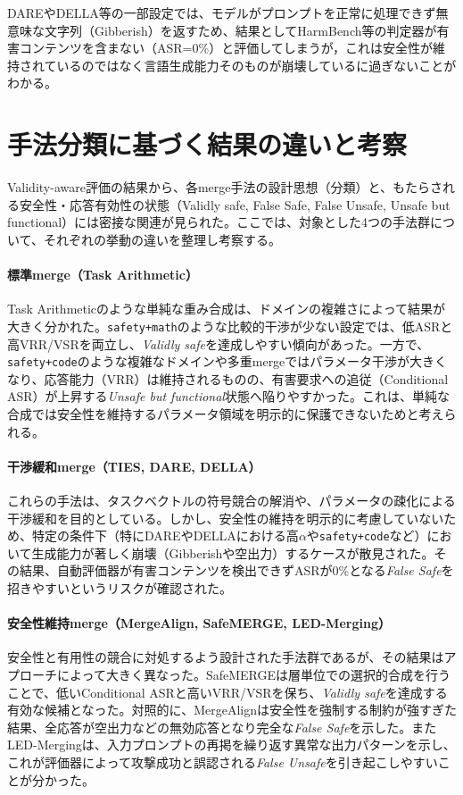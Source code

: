 \documentclass{article}
\begin{document}
DAREやDELLA等の一部設定では、モデルがプロンプトを正常に処理できず無意味な文字列（Gibberish）を返すため、結果としてHarmBench等の判定器が有害コンテンツを含まない（ASR=0\%）と評価してしまうが，これは安全性が維持されているのではなく言語生成能力そのものが崩壊しているに過ぎないことがわかる。
\color{black}

\section{手法分類に基づく結果の違いと考察}
\label{app:手法分類に基づく結果の違いと考察}
Validity-aware評価の結果から、各merge手法の設計思想（分類）と、もたらされる安全性・応答有効性の状態（Validly safe, False Safe, False Unsafe, Unsafe but functional）には密接な関連が見られた。ここでは、対象とした4つの手法群について、それぞれの挙動の違いを整理し考察する。

\paragraph{標準merge（Task Arithmetic）}
Task Arithmeticのような単純な重み合成は、ドメインの複雑さによって結果が大きく分かれた。\texttt{safety+math}のような比較的干渉が少ない設定では、低ASRと高VRR/VSRを両立し、\textit{Validly safe}を達成しやすい傾向があった。一方で、\texttt{safety+code}のような複雑なドメインや多重mergeではパラメータ干渉が大きくなり、応答能力（VRR）は維持されるものの、有害要求への追従（Conditional ASR）が上昇する\textit{Unsafe but functional}状態へ陥りやすかった。これは、単純な合成では安全性を維持するパラメータ領域を明示的に保護できないためと考えられる。

\paragraph{干渉緩和merge（TIES, DARE, DELLA）}
これらの手法は、タスクベクトルの符号競合の解消や、パラメータの疎化による干渉緩和を目的としている。しかし、安全性の維持を明示的に考慮していないため、特定の条件下（特にDAREやDELLAにおける高$\alpha$や\texttt{safety+code}など）において生成能力が著しく崩壊（Gibberishや空出力）するケースが散見された。その結果、自動評価器が有害コンテンツを検出できずASRが0\%となる\textit{False Safe}を招きやすいというリスクが確認された。

\paragraph{安全性維持merge（MergeAlign, SafeMERGE, LED-Merging）}
安全性と有用性の競合に対処するよう設計された手法群であるが、その結果はアプローチによって大きく異なった。SafeMERGEは層単位での選択的合成を行うことで、低いConditional ASRと高いVRR/VSRを保ち、\textit{Validly safe}を達成する有効な候補となった。対照的に、MergeAlignは安全性を強制する制約が強すぎた結果、全応答が空出力などの無効応答となり完全な\textit{False Safe}を示した。またLED-Mergingは、入力プロンプトの再掲を繰り返す異常な出力パターンを示し、これが評価器によって攻撃成功と誤認される\textit{False Unsafe}を引き起こしやすいことが分かった。
\end{document}
